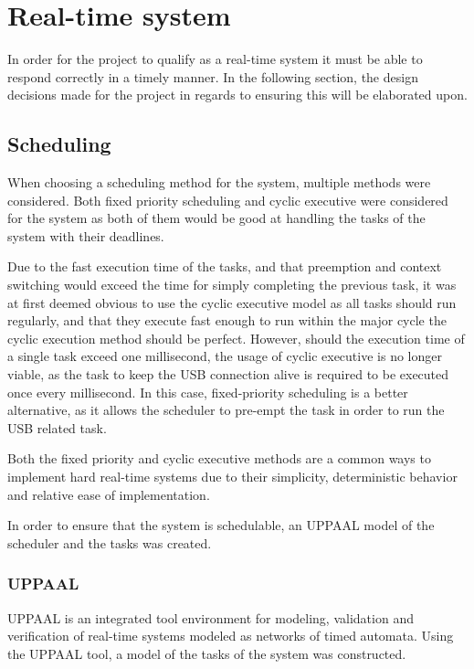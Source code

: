 \section{Real-time system}\label{Design:RTS} 
In order for the project to qualify as a real-time system it must be able to respond correctly in a timely manner.
In the following section, the design decisions made for the project in regards to ensuring this will be elaborated upon. 

\subsection{Scheduling}\label{Design:Scheduling}
When choosing a scheduling method for the system, multiple methods were considered. 
Both fixed priority scheduling and cyclic executive were considered for the system as both of them would be good at handling the tasks of the system with their deadlines.

Due to the fast execution time of the tasks, and that preemption and context switching would exceed the time for simply completing the previous task, it was at first deemed obvious to use the cyclic executive model as all tasks should run regularly, and that they execute fast enough to run within the major cycle the cyclic execution method should be perfect. 
However, should the execution time of a single task exceed one millisecond, the usage of cyclic executive is no longer viable, as the task to keep the USB connection alive is required to be executed once every millisecond.
In this case, fixed-priority scheduling is a better alternative, as it allows the scheduler to pre-empt the task in order to run the USB related task.

Both the fixed priority and cyclic executive methods are a common ways to implement hard real-time systems due to their simplicity, deterministic behavior and relative ease of implementation\cite{CyclicExecutionKimLarsen}.

In order to ensure that the system is schedulable, an UPPAAL model of the scheduler and the tasks was created. 

\subsubsection{UPPAAL}
UPPAAL is an integrated tool environment for modeling, validation and verification of real-time systems modeled as networks of timed automata\cite{UPPAALWebsite}. 
Using the UPPAAL tool, a model of the tasks of the system was constructed. 

